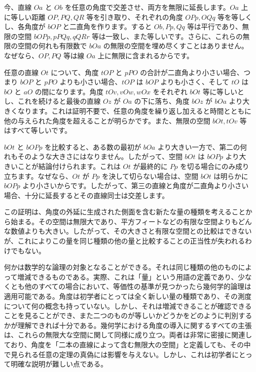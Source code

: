 \documentclass[a4paper,11pt,openany]{ltjsbook}
\begin{document}
今、直線 \( Oa \) と \( Ob \) を任意の角度で交差させ、両方を無限に延長します。\( Oa \) 上に等しい距離 \( OP, PQ, QR \) 等を引き取り、それぞれの角度 \( OPp, OQq \) 等を等しくし、各角度が \( bOP \) と二直角を作ります。すると \( Ob, Pp, Qq \) 等は平行であり、無限の空間 \( bOPp, pPQq, qQRr \) 等は一致し、また等しいです。さらに、これらの無限の空間の何れも有限数で \( bOa \) の無限の空間を埋め尽くすことはありません。なぜなら、\( OP, PQ \) 等は線 \( Oa \) 上に無限に含まれるからです。

任意の直線 \( Ot \) について、角度 \( tOP \) と \( pPO \) の合計が二直角より小さい場合、つまり \( bOP \) と \( pPO \) よりも小さい場合、\( tOP \) は \( bOP \) よりも小さく、そして \( tO \) は \( bO \) と \( aO \) の間になります。角度 \( tOv, vOw, wOx \) をそれぞれ \( bOt \) 等に等しいとし、これを続けると最後の直線 \( Oz \) が \( Oa \) の下に落ち、角度 \( bOz \) が \( bOa \) より大きくなります。これは証明不要で、任意の角度を繰り返し加えると時間とともに他の与えられた角度を超えることが明らかです。また、無限の空間 \( bOt, tOv \) 等はすべて等しいです。

\( bOt \) と \( bOPp \) を比較すると、ある数の最初が \( bOa \) より大きい一方で、第二の何れもそのような大きさにはなりません。したがって、空間 \( bOt \) は \( bOPp \) より大きいことが結論付けられます。これは \( Ot \) が最終的に \( Pp \) を切る場合にのみ成り立ちます。なぜなら、\( Ot \) が \( Pp \) を決して切らない場合は、空間 \( bOt \) は明らかに \( bOPp \) より小さいからです。したがって、第三の直線と角度が二直角より小さい場合、十分に延長するとその直線同士は交差します。

この証明は、角度の外延に生成された側面を含む新たな量の種類を考えることから始まる。その空間は無限大であり、平方フィートなどの有限な空間よりもどんな数値よりも大きい。したがって、その大きさと有限な空間との比較はできないが、これによりこの量を同じ種類の他の量と比較することの正当性が失われるわけでもない。

何かは数学的な論理の対象となることができる。それは同じ種類の他のものによって増減できるものである。実際、これは「量」という用語の定義であり、少なくとも他のすべての場合において、等価性の基準が見つかったら幾何学的論理は適用可能である。角度は初学者にとっては全く新しい量の種類であり、その測度について何の概念も持っていない。しかし、それは増減できることが確認できることを見ることができ、また二つのものが等しいかどうかをどのように判別するかが理解できれば十分である。幾何学における角度の導入に関するすべての主張は、これらの無限大な空間に関して同様に成り立つ。両者は非常に密接に関連しており、角度を「二本の直線によって含む無限大の空間」と定義しても、その中で見られる任意の定理の真偽には影響を与えない。しかし、これは初学者にとって明確な説明が難しい点である。
\end{document}
